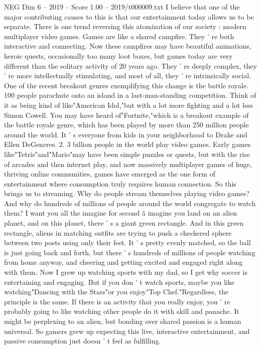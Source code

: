 \begin{textsample}{NEG Dim 6 – 2019 – Score 1.00 – 2019/t000009.txt}
I believe that one of the major contributing causes to this is that our entertainment today allows us to be separate.
There is one trend reversing this atomization of our society : modern multiplayer video games.
Games are like a shared campfire.
They ' re both interactive and connecting.
Now these campfires may have beautiful animations, heroic quests, occasionally too many loot boxes, but games today are very different than the solitary activity of 20 years ago.
They ' re deeply complex, they ' re more intellectually stimulating, and most of all, they ' re intrinsically social.
One of the recent breakout genres exemplifying this change is the battle royale. 100 people parachute onto an island in a last-man-standing competition.
Think of it as being kind of like"American Idol,"but with a lot more fighting and a lot less Simon Cowell.
You may have heard of"Fortnite,"which is a breakout example of the battle royale genre, which has been played by more than 250 million people around the world.
It ' s everyone from kids in your neighborhood to Drake and Ellen DeGeneres. 2. 3 billion people in the world play video games.
Early games like"Tetris"and"Mario"may have been simple puzzles or quests, but with the rise of arcades and then internet play, and now massively multiplayer games of huge, thriving online communities, games have emerged as the one form of entertainment where consumption truly requires human connection.
So this brings us to streaming.
Why do people stream themselves playing video games?
And why do hundreds of millions of people around the world congregate to watch them?
I want you all the imagine for second â imagine you land on an alien planet, and on this planet, there ' s a giant green rectangle.
And in this green rectangle, aliens in matching outfits are trying to push a checkered sphere between two posts using only their feet.
It ' s pretty evenly matched, so the ball is just going back and forth, but there ' s hundreds of millions of people watching from home anyway, and cheering and getting excited and engaged right along with them.
Now I grew up watching sports with my dad, so I get why soccer is entertaining and engaging.
But if you don ' t watch sports, maybe you like watching"Dancing with the Stars"or you enjoy"Top Chef."Regardless, the principle is the same.
If there is an activity that you really enjoy, you ' re probably going to like watching other people do it with skill and panache.
It might be perplexing to an alien, but bonding over shared passion is a human universal.
So gamers grew up expecting this live, interactive entertainment, and passive consumption just doesn ' t feel as fulfilling.

\end{textsample}
